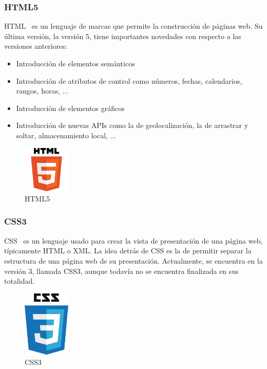 \subsubsection*{HTML5}

HTML~\cite{html5} es un lenguaje de marcas que permite la construcción de páginas web. Su última versión, la versión 5, tiene importantes novedades con respecto a las versiones anteriores:

\begin{itemize}
\item Introducción de elementos semánticos
\item Introducción de atributos de control como números, fechas, calendarios, rangos, horas, ...
\item Introducción de elementos gráficos
\item Introducción de nuevas APIs como la de geolocalización, la de arrastrar y soltar, almacenamiento local, ...
\end{itemize}   

\begin{figure}[tbh]
\centering
\label{fig:html5}
\includegraphics[width=0.2\textwidth]{imagenes/html5}
\caption{HTML5}
\end{figure}

\subsubsection*{CSS3}
CSS~\cite{css3} es un lenguaje usado para crear la vista de presentación de una página web, típicamente HTML o XML. La idea detrás de CSS es la de permitir separar la estructura de una página web de su presentación. Actualmente, se encuentra en la versión 3, llamada CSS3, aunque todavía no se encuentra finalizada en sus totalidad.

\begin{figure}[tbh]
\centering
\label{fig:css3}
\includegraphics[width=0.2\textwidth]{imagenes/css3}
\caption{CSS3}
\end{figure}

